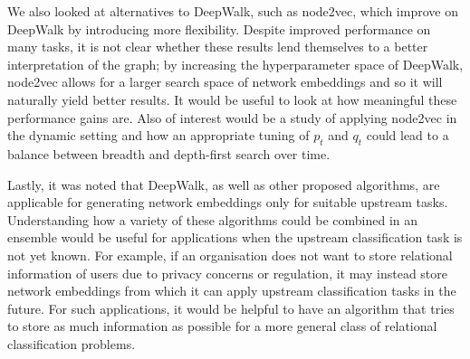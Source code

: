 \documentclass[a4paper]{article}
\begin{document}
We also looked at alternatives to DeepWalk, such as node2vec, which improve on DeepWalk by introducing more flexibility. Despite improved performance on many tasks, it is not clear whether these results lend themselves to a better interpretation of the graph; by increasing the hyperparameter space of DeepWalk, node2vec allows for a larger search space of network embeddings and so it will naturally yield better results.
It would be useful to look at how meaningful these performance gains are. Also of interest would be a study of applying node2vec in the dynamic setting and how an appropriate tuning of $p_t$ and $q_t$ could lead to a balance between breadth and depth-first search over time.

Lastly, it was noted that DeepWalk, as well as other proposed algorithms, are applicable for generating network embeddings only for suitable upstream tasks. Understanding how a variety of these algorithms could be combined in an ensemble would be useful for applications when the upstream classification task is not yet known. For example, if an organisation
does not want to store relational information of users due to privacy concerns or regulation, it may instead store network embeddings from which it can apply upstream classification tasks in the future. For such applications, it would be helpful to have an algorithm that tries to store as much information as possible for a more general class of relational classification problems.






\printindex
\end{document}

